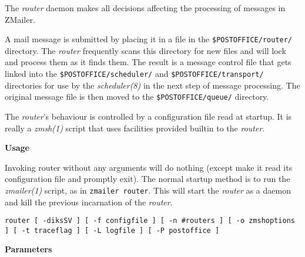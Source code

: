 

The {\em router} daemon makes all decisions affecting 
the processing of messages in ZMailer.

A mail message is submitted by placing it in a file in the
{\tt \$POSTOFFICE/router/} directory. The 
{\em router} frequently scans this directory for new 
files and will lock and process them as it finds them. 
The result is a message control file that gets linked into 
the {\tt \$POSTOFFICE/scheduler/} and 
{\tt \$POSTOFFICE/transport/} directories for use 
by the {\em scheduler(8)} in the next step of message 
processing. The original message file is then moved to the 
{\tt \$POSTOFFICE/queue/} directory. 

The {\em router}'s behaviour is controlled by a 
configuration file read at startup. It is really a 
{\em zmsh(1)} script that uses facilities provided 
builtin to the {\em router}. 

{\bf Usage}

Invoking router without any arguments will do nothing
(except make it read its configuration file and promptly
exit). The normal startup method is to run the {\em zmailer(1)} 
script, as in {\tt zmailer router}. This will start the 
{\em router} as a daemon and  kill the previous 
incarnation of the {\em router}. 

{\tt router [ -diksSV ] [ -f configfile ] [ -n \#routers ] [ -o zmshoptions ] [ -t traceflag ] [ -L logfile ] [ -P postoffice ]}
 

{\bf Parameters}

